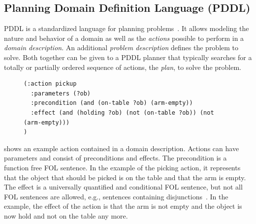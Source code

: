 \subsection{Planning Domain Definition Language (PDDL)}
PDDL is a standardized language for planning
problems~\cite{PDDL}. It allows modeling the nature and behavior of a
domain as well as the \emph{actions} possible to perform in a
\emph{domain description}. An additional \emph{problem description}
defines the problem to solve. Both together can be given to a PDDL
planner that typically searches for a totally or partially ordered
sequence of actions, the \emph{plan}, to solve the problem.
\begin{figure}
\begin{lstlisting}[showlines,style=ReallySmallCLIPS, caption={PDDL
      action to pick up an object from a table},
  label=lsf:pddl-action,
  emph={skill, args, state, target, res},
  emphstyle=\bfseries\color{green!80!black},
  emph={[2]\?skill, \$\?args, wait-for-lock, \?target, use,
  WAIT-FOR-LOCK, SKILL-EXECUTION, running},
  emphstyle={[2]\bfseries\color{blue!80!black}},
  morekeywords={action, parameters, precondition, effect}]
(:action pickup
  :parameters (?ob)
  :precondition (and (on-table ?ob) (arm-empty))
  :effect (and (holding ?ob) (not (on-table ?ob)) (not (arm-empty)))
)
\end{lstlisting}
\end{figure}
 shows an example action contained in a domain
description.  Actions can have parameters and consist of preconditions
and effects. The precondition is a function free FOL sentence. In the
example of the picking action, it represents that the object that
should be picked is on the table and that the arm is empty. The effect
is a universally quantified and conditional FOL sentence, but not all FOL
sentences are allowed, e.g., sentences containing disjunctions~\cite{PDDL}. In the
example, the effect of the action is that the arm is not empty and the
object is now hold and not on the table any more.

